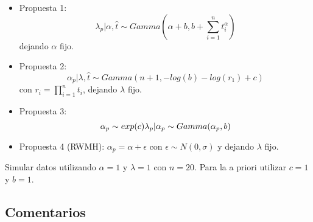 \documentclass[preprint,12pt]{elsarticle}
\begin{document}
\begin{itemize}
    \item Propuesta 1: 
    \begin{equation}
    \lambda_p| \alpha,\hat{t} \sim Gamma( \alpha +b, b + \sum_{i=1}^n t_i^\alpha)  
    \end{equation}
    dejando $\alpha$ fijo.
    \item Propuesta 2:
    \begin{equation}
        \alpha_p | \lambda, \hat{t} \sim Gamma(n+1, -log(b) - log(r_1) + c)
    \end{equation}
    con $r_i = \prod_{i=1}^n t_i$, dejando $\lambda$ fijo.
    \item Propuesta 3:
    \begin{equation}
        \alpha_p \sim exp(c) \\
        \lambda_p | \alpha_p \sim Gamma(\alpha_p, b)
    \end{equation}
    \item Propuesta 4 (RWMH):
    $\alpha_p = \alpha + \epsilon$ con $\epsilon \sim N(0, \sigma)$ y dejando $\lambda$ fijo.
\end{itemize}
Simular datos utilizando $\alpha=1$ y $\lambda=1$ con $n=20$. Para la a priori utilizar $c=1$ y $b=1$.

\subsection*{Comentarios}
\end{document}
